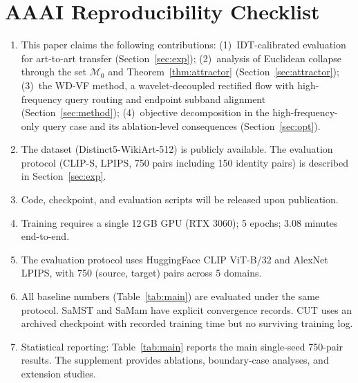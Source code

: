 \documentclass[letterpaper]{article}
\begin{document}
\FloatBarrier



\section*{AAAI Reproducibility Checklist}

\begin{enumerate}
\item This paper claims the following contributions:
(1)~IDT-calibrated evaluation for art-to-art transfer (Section~\ref{sec:exp});
(2)~analysis of Euclidean collapse through the set $\mathcal{M}_0$ and Theorem~\ref{thm:attractor} (Section~\ref{sec:attractor});
(3)~the WD-VF method, a wavelet-decoupled rectified flow with high-frequency query routing and endpoint subband alignment (Section~\ref{sec:method});
(4)~objective decomposition in the high-frequency-only query case and its ablation-level consequences (Section~\ref{sec:opt}).
\item The dataset (Distinct5-WikiArt-512) is publicly available. The evaluation protocol (CLIP-S, LPIPS, 750 pairs including 150 identity pairs) is described in Section~\ref{sec:exp}.
\item Code, checkpoint, and evaluation scripts will be released upon publication.
\item Training requires a single 12\,GB GPU (RTX 3060); 5 epochs; 3.08 minutes end-to-end.
\item The evaluation protocol uses HuggingFace CLIP ViT-B/32 and AlexNet LPIPS, with 750 (source, target) pairs across 5 domains.
\item All baseline numbers (Table~\ref{tab:main}) are evaluated under the same protocol.
SaMST and SaMam have explicit convergence records.
CUT uses an archived checkpoint with recorded training time but no surviving training log.
\item Statistical reporting: Table~\ref{tab:main} reports the main single-seed 750-pair results.
The supplement provides ablations, boundary-case analyses, and extension studies.
\end{enumerate}
\end{document}
